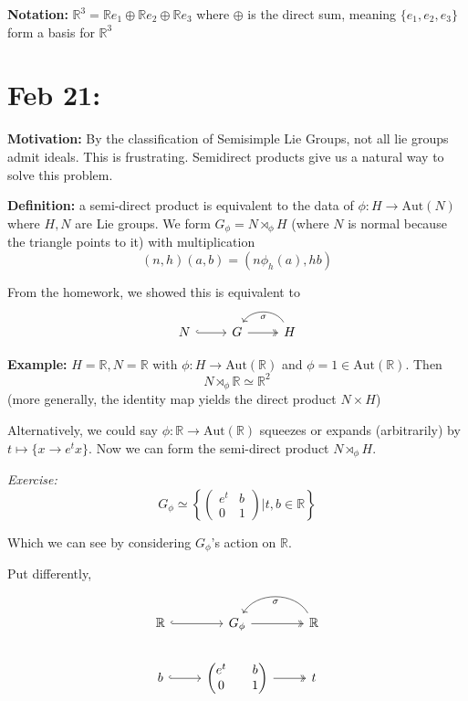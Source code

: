 \documentclass[12pt]{article}
\newcommand{\R}{\mathbb{R}}
\begin{document}
    \textbf{Notation:} $\R^3 = \R e_1 \oplus \R e_2 \oplus \R e_3$ where $\oplus$ is the direct sum, meaning $\{e_1, e_2, e_3\}$ form a basis for $\R^3$ 

\section{Feb 21:}
    \textbf{Motivation:} By the classification of Semisimple Lie Groups, not all lie groups admit ideals. This is frustrating. Semidirect products give us a natural way to solve this problem. 

    \textbf{Definition:} a semi-direct product is equivalent to the data of $\phi: H \to \text{Aut}(N)$ where $H, N$ are Lie groups. We form $G_{\phi} = N \rtimes_{\phi} H$ (where $N$ is normal because the triangle points to it) with multiplication 
    \[(n, h)(a, b) = (n \phi_h(a), hb)\]

    From the homework, we showed this is equivalent to 
    \[\begin{tikzcd}
        N \arrow[hook]{r} & G \arrow[two heads]{r} & H \arrow[bend right=60]{l}{\sigma}
    \end{tikzcd}\]

    \textbf{Example:} $H = \R, N = \R$ with $\phi: H \to \text{Aut}(\R)$ and $\phi = 1 \in \text{Aut}(\R)$. Then 
    \[N \rtimes_{\phi} \R \simeq \R^2\] 
    (more generally, the identity map yields the direct product $N \times H$) 

    Alternatively, we could say $\phi: \R \to \text{Aut}(\R)$ squeezes or expands (arbitrarily) by $t \mapsto \{x \to e^t x\}$. Now we can form the semi-direct product $N \rtimes_{\phi} H$. 

    \emph{Exercise:}
    \[G_{\phi} \simeq \left\{\begin{pmatrix}
        e^t & b\\ 
        0 & 1
    \end{pmatrix} \bigg\vert t, b \in \R\right\}\]

    Which we can see by considering $G_{\phi}$'s action on $\R$. 

    Put differently, 
    \[\begin{tikzcd}
        \R \arrow[hook]{r} & G_{\phi} \arrow[two heads]{r} & \R \arrow[bend right=60]{l}{\sigma}\\ 
        b \arrow[hook]{r} & \begin{pmatrix}
            e^t & b\\ 
            0 & 1
        \end{pmatrix} \arrow[two heads]{r} & t
    \end{tikzcd}\]
\end{document}
